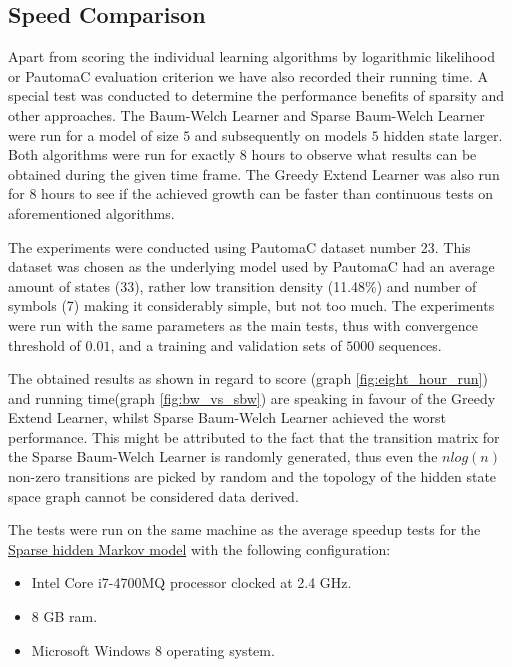 \subsection{Speed Comparison}

Apart from scoring the individual learning algorithms by logarithmic likelihood or PautomaC evaluation criterion we have also recorded their running time. A special test was conducted to determine the performance benefits of sparsity and other approaches. The Baum-Welch Learner and Sparse Baum-Welch Learner were run for a model of size $5$ and subsequently on models $5$ hidden state larger. Both algorithms were run for exactly 8 hours to observe what results can be obtained during the given time frame. The Greedy Extend Learner was also run for 8 hours to see if the achieved growth can be faster than continuous tests on aforementioned algorithms.

The experiments were conducted using PautomaC dataset number 23. This dataset was chosen as the underlying model used by PautomaC had an average amount of states (33), rather low transition density (11.48\%) and number of symbols (7) making it considerably simple, but not too much. The experiments were run with the same parameters as the main tests, thus with convergence threshold of $0.01$, and a training and validation sets of $5000$ sequences.

The obtained results as shown in regard to score (graph \ref{fig:eight_hour_run}) and running time(graph \ref{fig:bw_vs_sbw}) are speaking in favour of the Greedy Extend Learner, whilst Sparse Baum-Welch Learner achieved the worst performance. This might be attributed to the fact that the transition matrix for the Sparse Baum-Welch Learner is randomly generated, thus even the $nlog(n)$ non-zero transitions are picked by random and the topology of the hidden state space graph cannot be considered data derived.

The tests were run on the same machine as the average speedup tests for the \hyperref[sec:shmm]{Sparse hidden Markov model} with the following configuration:
\begin{itemize}
	\item[] Intel Core i7-4700MQ processor clocked at 2.4 GHz.
	\item[] 8 GB \gls{ram}.
	\item[] Microsoft Windows 8 operating system.
\end{itemize}

